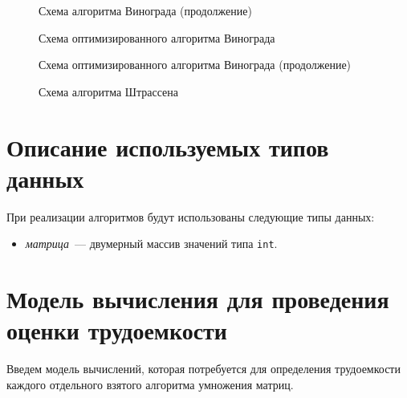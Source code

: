 \begin{figure}[H]
    \centering
    
    \caption{Схема алгоритма Винограда (продолжение)}
    \label{fig:scheme-winograd-pt2}
\end{figure}

\begin{figure}[H]
    \centering
    
    \caption{Схема оптимизированного алгоритма Винограда}
    \label{fig:scheme-winograd-opt-pt1}
\end{figure}

\begin{figure}[H]
    \centering
    
    \caption{Схема оптимизированного алгоритма Винограда (продолжение)}
    \label{fig:scheme-winograd-opt-pt2}
\end{figure}

\begin{figure}[H]
    \centering
    
    \caption{Схема алгоритма Штрассена}
    \label{fig:scheme-strassen}
\end{figure}

\section{Описание используемых типов данных}

При реализации алгоритмов будут использованы следующие типы данных:

\begin{itemize}
    \item \textit{матрица}~--- двумерный массив значений типа \texttt{int}.
\end{itemize}

\section{Модель вычисления для проведения оценки трудоемкости}

Введем модель вычислений, которая потребуется для определения трудоемкости каждого отдельного взятого алгоритма умножения матриц.

